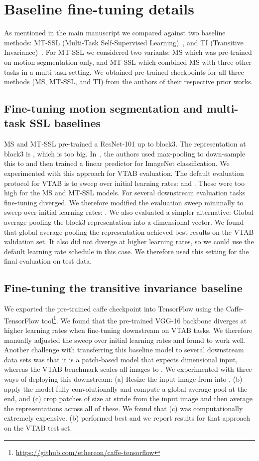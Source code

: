 \documentclass[10pt,twocolumn,letterpaper]{article}
\begin{document}
{\section{Baseline fine-tuning details}

As mentioned in the main manuscript we compared against two baseline methods: MT-SSL (Multi-Task Self-Supervised Learning)~\cite{doersch2017multi}, and TI (Transitive Invariance)~\cite{wang2017transitive}. For MT-SSL we considered two variants: MS which was pre-trained on motion segmentation only, and MT-SSL which combined MS with three other tasks in a multi-task setting. We obtained pre-trained checkpoints for all three methods (MS, MT-SSL, and TI) from the authors of their respective prior works.

\subsection{Fine-tuning motion segmentation and multi-task SSL baselines}
MS and MT-SSL pre-trained a ResNet-101 up to block3. The representation at block3 is , which is too big. In~\cite{doersch2017multi}, the authors used max-pooling to down-sample this to  and then trained a linear predictor for ImageNet classification. We experimented with this approach for VTAB evaluation. The default evaluation protocol for VTAB is to sweep over initial learning rates:  and . These were too high for the MS and MT-SSL models. For several downstream evaluation tasks fine-tuning diverged. We therefore modified the evaluation sweep minimally to sweep over initial learning rates: . We also evaluated a simpler alternative: Global average pooling the block3 representation into a  dimensional vector. We found that global average pooling the representation achieved best results on the VTAB validation set. It also did not diverge at higher learning rates,  so we could use the default learning rate schedule in this case. We therefore used this setting for the final evaluation on test data.

\subsection{Fine-tuning the transitive invariance baseline}
We exported the pre-trained caffe checkpoint into TensorFlow using the Caffe-TensorFlow tool\footnote{\url{https://github.com/ethereon/caffe-tensorflow}}. We found that the pre-trained VGG-16 backbone diverges at higher learning rates when fine-tuning downstream on VTAB tasks. We therefore manually adjusted the sweep over initial learning rates and found  to work well. Another challenge with transferring this baseline model to several downstream data sets was that it is a patch-based model that expects  dimensional input, whereas the VTAB benchmark scales all images to . We experimented with three ways of deploying this downstream: (a) Resize the input image from  into , (b) apply the model fully convolutionally and compute a global average pool at the end, and (c) crop patches of size  at stride  from the input image and then average the representations across all of these. We found that (c) was computationally extremely expensive. (b) performed best and we report results for that approach on the VTAB test set.

}
\end{document}
